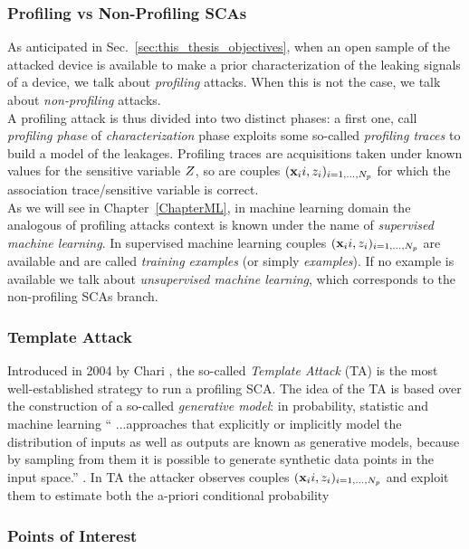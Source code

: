 \subsubsection{Profiling vs Non-Profiling SCAs}
As anticipated in Sec.~\ref{sec:this_thesis_objectives}, when an open sample of the attacked device is available to make a prior characterization of the leaking signals of a device, we talk about \emph{profiling} attacks. When this is not the case, we talk about \emph{non-profiling} attacks. \\
A profiling attack is thus divided into two distinct phases: a first one, call \emph{profiling phase} of \emph{characterization} phase exploits some so-called \emph{profiling traces} to build a model of the leakages. Profiling traces are acquisitions taken under known values for the sensitive variable $Z$, so are couples $(\textbf{x}_{i}{i}, z_i)_{i=1, \dots , N_p}$ for which the association trace/sensitive variable is correct. \\
As we will see in Chapter~\ref{ChapterML}, in machine learning domain the analogous of profiling attacks context is known under the name of \emph{supervised machine learning}. In supervised machine learning couples $(\textbf{x}_{i}{i}, z_i)_{i=1, \dots , N_p}$ are available and are called \emph{training examples} (or simply \emph{examples}). If no example is available we talk about \emph{unsupervised machine learning}, which corresponds to the non-profiling SCAs branch. 

\subsubsection{Template Attack}
Introduced in 2004 by Chari \cite{Chari2003}, the so-called \emph{Template Attack} (TA) is the most well-established strategy to run a profiling SCA. The idea of the TA is based over the construction of a so-called \emph{generative model}: in probability, statistic and machine learning \enquote{ ...approaches that explicitly or implicitly model the distribution of inputs as well as outputs are known as generative models, because by sampling from them it is possible to generate synthetic data points in the input space.} \cite{christopher2006pattern}.
In TA the attacker observes couples $(\textbf{x}_{i}{i}, z_i)_{i=1, \dots , N_p}$  and exploit them to estimate both the a-priori conditional probability  

\subsubsection{Points of Interest}

